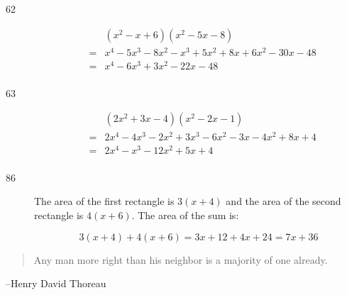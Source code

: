\documentclass[letterpaper, landscape]{exam}
\begin{document}
\begin{description}
      \item[62]
      \begin{eqnarray*}
        && (x^2 - x + 6)(x^2 - 5x - 8) \\
        &=& x^4 - 5x^3 - 8x^2 - x^3 + 5x^2 + 8x + 6x^2 - 30x - 48 \\
        &=& x^4 - 6x^3 + 3x^2 - 22x - 48 \\
      \end{eqnarray*}

      \item[63]
      \begin{eqnarray*}
        && (2x^2 + 3x - 4)(x^2 - 2x - 1) \\
        &=& 2x^4 - 4x^3 - 2x^2 + 3x^3 - 6x^2 - 3x - 4x^2 + 8x + 4 \\
        &=& 2x^4 - x^3 - 12x^2 + 5x + 4 \\
      \end{eqnarray*}

      \item[86]

      The area of the first rectangle is \( 3(x + 4) \) and the area of the second rectangle is \( 4(x + 6) \).
        The area of the sum is:

      \[ 3(x + 4) + 4(x + 6) = 3x + 12 + 4x + 24 = 7x + 36 \]

    \end{description}
  \fi
  \ifprintanswers{}
  \else
    \vspace{3 cm}
    \begin{quote}
      \begin{em}
        Any man more right than his neighbor is a majority of one already.
      \end{em}
    \end{quote}
    \hspace{2 cm}--Henry David Thoreau
  \fi
\end{document}
